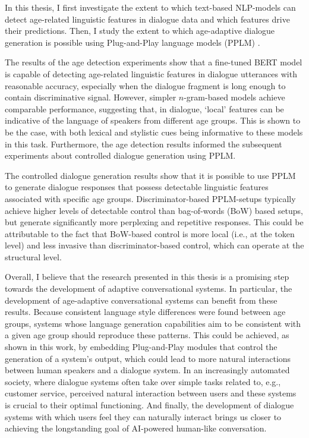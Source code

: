 
In this thesis, I first investigate the extent to which text-based NLP-models can detect age-related linguistic features in dialogue data and which features drive their predictions. Then, I study the extent to which age-adaptive dialogue generation is possible using Plug-and-Play language models (PPLM) \citep{dathathri2019plug}.

The results of the age detection experiments show that a fine-tuned BERT model is capable of detecting age-related linguistic features in dialogue utterances with reasonable accuracy, especially when the dialogue fragment is long enough to contain discriminative signal. However, simpler $n$-gram-based models achieve comparable performance, suggesting that, in dialogue, ‘local’ features can be indicative of the language of speakers from different age groups. This is shown to be the case, with both lexical and stylistic cues being informative to these models in this task. Furthermore, the age detection results informed the subsequent experiments about controlled dialogue generation using PPLM.

The controlled dialogue generation results show that it is possible to use PPLM to generate dialogue responses that possess detectable linguistic features associated with specific age groups. Discriminator-based PPLM-setups typically achieve higher levels of detectable control 
than bag-of-words (BoW) based setups, but generate significantly more perplexing and repetitive responses. This could be attributable to the fact that BoW-based control is more local (i.e., at the token level) and less invasive than discriminator-based control, which can operate at the structural level. 

Overall, I believe that the research presented in this thesis is a promising step towards the development of adaptive conversational systems. In particular, the development of age-adaptive conversational systems can benefit from these results. Because consistent language style differences were found between age groups, systems whose language generation capabilities aim to be consistent with a given age group should reproduce these patterns. This could be achieved, as shown in this work, by embedding Plug-and-Play modules that control the generation of a system’s output, which could lead to more natural interactions between human speakers and a dialogue system. 
In an increasingly automated society, where dialogue systems often take over simple tasks related to, e.g., customer service, perceived natural interaction between users and these systems is crucial to their optimal functioning.
And finally, the development of dialogue systems with which users feel they can naturally interact brings us closer to achieving the longstanding goal of AI-powered human-like conversation.


